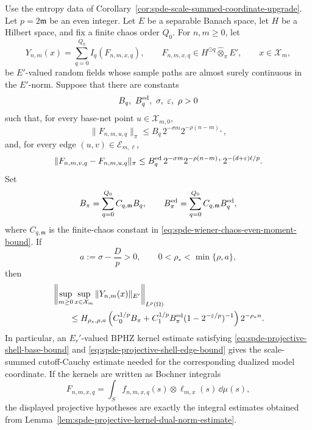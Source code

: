 \begin{corollary}
\label{cor:spde-projective-shell-separated-coordinate-criterion}
Use the entropy data of
Corollary~\ref{cor:spde-scale-summed-coordinate-upgrade}.  Let
\(p=2\mathfrak m\) be an even integer.  Let \(E\) be a separable Banach
space, let \(H\) be a Hilbert space, and fix a finite chaos order \(Q_0\).
For \(n,m\geq0\), let
\[
  Y_{n,m}(x)=
  \sum_{q=0}^{Q_0} I_q(F_{n,m,x,q}),
  \qquad
  F_{n,m,x,q}\in H^{\odot q}\widehat\otimes_\pi E',
  \qquad x\in\mathcal X_m,
\]
be \(E'\)-valued random fields whose sample paths are almost surely
continuous in the \(E'\)-norm.  Suppose that there are constants
\[
  B_q,\ B_q^{\rm ed},\ \sigma,\ \varepsilon,\ \rho>0
\]
such that, for every base-net point \(u\in\mathcal X_{m,0}\),
\begin{equation}
  \|F_{n,m,u,q}\|_\pi
  \leq
  B_q\,2^{-\sigma m}2^{-\rho(n-m)_+},
  \label{eq:spde-projective-shell-base-bound}
\end{equation}
and, for every edge \((u,v)\in\mathcal E_{m,\ell}\),
\begin{equation}
  \|F_{n,m,v,q}-F_{n,m,u,q}\|_\pi
  \leq
  B_q^{\rm ed}\,
  2^{-\sigma m}2^{-\rho(n-m)_+}
  2^{-(d+\varepsilon)\ell/p}.
  \label{eq:spde-projective-shell-edge-bound}
\end{equation}
Set
\[
  B_\pi=\sum_{q=0}^{Q_0} C_{q,\mathfrak m}B_q,
  \qquad
  B_\pi^{\rm ed}=\sum_{q=0}^{Q_0} C_{q,\mathfrak m}B_q^{\rm ed},
\]
where \(C_{q,\mathfrak m}\) is the finite-chaos constant in
\eqref{eq:spde-wiener-chaos-even-moment-bound}.  If
\[
  a:=\sigma-\frac{D}{p}>0,
  \qquad
  0<\rho_*<\min\{\rho,a\},
\]
then
\begin{equation}
\begin{aligned}
  &\left\|
    \sup_{m\geq0}\sup_{x\in\mathcal X_m}
    \|Y_{n,m}(x)\|_{E'}
  \right\|_{L^p(\Omega)}
  \\
  &\qquad\leq
  H_{\rho_*,\rho,a}
  \left(
    C_0^{1/p}B_\pi+
    C_1^{1/p}B_\pi^{\rm ed}(1-2^{-\varepsilon/p})^{-1}
  \right)2^{-\rho_*n}.
\end{aligned}
  \label{eq:spde-projective-shell-coordinate-bound}
\end{equation}
In particular, an \(E_r'\)-valued BPHZ kernel estimate satisfying
\eqref{eq:spde-projective-shell-base-bound} and
\eqref{eq:spde-projective-shell-edge-bound} gives the scale-summed
cutoff-Cauchy estimate needed for the corresponding dualized model
coordinate.  If the kernels are written as Bochner integrals
\[
  F_{n,m,x,q}=\int_S f_{n,m,x,q}(s)\otimes\ell_{m,x}(s)\,\dd\mu(s),
\]
the displayed projective hypotheses are exactly the integral estimates
obtained from Lemma~\ref{lem:spde-projective-kernel-dual-norm-estimate}.
\end{corollary}

